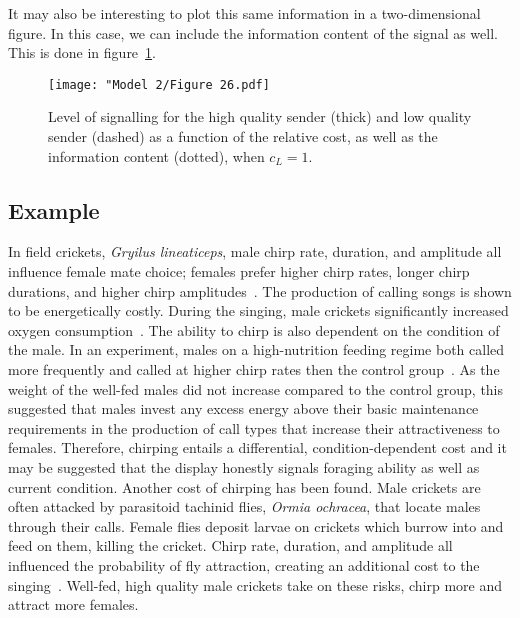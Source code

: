 \documentclass[a4paper,12pt]{article}
\numberwithin{equation}{section}
\begin{document}
\newpage

It may also be interesting to plot this same information in a two-dimensional figure. In this case, we can include the information content of the signal as well. This is done in figure~\ref{fig:Model 2/Figure 26.pdf}.
\begin{figure}[!h]
\captionsetup{width=250pt}
\begin{center}
\leavevmode
\texttt{[image: "Model 2/Figure 26.pdf]}
\caption{Level of signalling for the high quality sender (thick) and low quality sender (dashed) as a function of the relative cost, as well as the information content (dotted), when $c_{L}=1$.}
\label{fig:Model 2/Figure 26.pdf}
\end{center}
\end{figure}


\subsection{Example}
\label{sec:SignalDetectionModel/Example}

In field crickets, \textit{Gryilus lineaticeps}, male chirp rate, duration, and amplitude all influence female mate choice; females prefer higher chirp rates, longer chirp durations, and higher chirp amplitudes~\cite{Wagner1996}. The production of calling songs is shown to be energetically costly. During the singing, male crickets significantly increased oxygen consumption~\cite{Hoback1997}. The ability to chirp is also dependent on the condition of the male. In an experiment, males on a high-nutrition feeding regime both called more frequently and called at higher chirp rates then the control group~\cite{Wagner1999}. As the weight of the well-fed males did not increase compared to the control group, this suggested that males invest any excess energy above their basic maintenance requirements in the production of call types that increase their attractiveness to females. Therefore, chirping entails a differential, condition-dependent cost and it may be suggested that the display honestly signals foraging ability as well as current condition. Another cost of chirping has been found. Male crickets are often attacked by parasitoid tachinid flies, \textit{Ormia ochracea}, that locate males through their calls. Female flies deposit larvae on crickets which burrow into and feed on them, killing the cricket. Chirp rate, duration, and amplitude all influenced the probability of fly attraction, creating an additional cost to the singing~\cite{Wagner1996}. Well-fed, high quality male crickets take on these risks, chirp more and attract more females.
\end{document}
